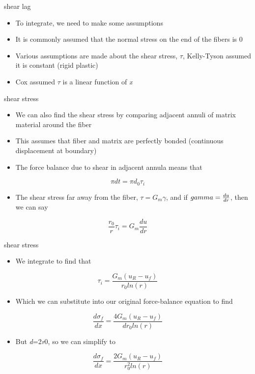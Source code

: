 \documentclass[
  letterpaper,
  ignorenonframetext,
  aspectratio=43,
  handout,
  12pt]{beamer}
\providecommand{\tightlist}{%
  \setlength{\itemsep}{0pt}\setlength{\parskip}{0pt}}
\providecommand{\tightlist}{%
\setlength{\itemsep}{0pt}\setlength{\parskip}{0pt}}
\begin{document}
\begin{frame}{shear lag}
\protect\hypertarget{shear-lag-2}{}
\begin{itemize}
\tightlist
\item
  To integrate, we need to make some assumptions
\item
  It is commonly assumed that the normal stress on the end of the fibers
  is 0
\item
  Various assumptions are made about the shear stress, \(\tau\),
  Kelly-Tyson assumed it is constant (rigid plastic)
\item
  Cox assumed \(\tau\) is a linear function of \emph{x}
\end{itemize}
\end{frame}

\begin{frame}{shear stress}
\protect\hypertarget{shear-stress}{}
\begin{itemize}
\tightlist
\item
  We can also find the shear stress by comparing adjacent annuli of
  matrix material around the fiber
\item
  This assumes that fiber and matrix are perfectly bonded (continuous
  displacement at boundary)
\item
  The force balance due to shear in adjacent annula means that
\end{itemize}

\[ \pi d t = \pi d_0 \tau_i \]

\begin{itemize}
\tightlist
\item
  The shear stress far away from the fiber, \(\tau = G_m \gamma\), and
  if \(\\gamma = \frac{du}{dr}\), then we can say
\end{itemize}

\[\frac{r_0}{r} \tau_i = G_m \frac{du}{dr}\]
\end{frame}

\begin{frame}{shear stress}
\protect\hypertarget{shear-stress-1}{}
\begin{itemize}
\tightlist
\item
  We integrate to find that
\end{itemize}

\[\tau_i = \frac{G_m(u_R-u_f)}{r_0 ln(r)}\]

\begin{itemize}
\tightlist
\item
  Which we can substitute into our original force-balance equation to
  find
\end{itemize}

\[\frac{d\sigma_f}{dx} = \frac{4 G_m(u_R-u_f)}{ d r_0 ln(r)}\]

\begin{itemize}
\tightlist
\item
  But \emph{d}=2\emph{r}0, so we can simplify to
\end{itemize}

\[\frac{d\sigma_f}{dx} = \frac{2 G_m(u_R-u_f)}{ r_0^2 ln(r)}\]
\end{frame}
\end{document}
